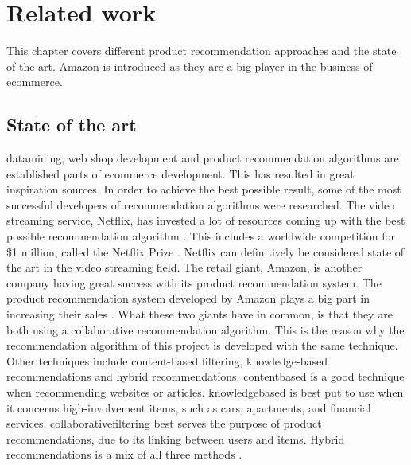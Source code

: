 
\chapter{Related work} %

\label{RelatedWork} %

This chapter covers different product recommendation approaches and the state of the art. \gls{Amazon} is introduced as they are a big player in the business of \gls{ecommerce}.

\section{State of the art}

\gls{datamining}, web shop development and product recommendation algorithms are established parts of \gls{ecommerce} development. This has resulted in great inspiration sources. In order to achieve the best possible result, some of the most successful developers of recommendation algorithms were researched. The video streaming service, Netflix, has invested a lot of resources coming up with the best possible recommendation algorithm \cite{Netflix}. This includes a worldwide competition for \$1 million, called the Netflix Prize \cite{NetflixPrize}. Netflix can definitively be considered state of the art in the video streaming field. The retail giant, \gls{Amazon}, is another company having great success with its product recommendation system. The product recommendation system developed by \gls{Amazon} plays a big part in increasing their sales \cite{AmazonSuccess}. What these two giants have in common, is that they are both using a collaborative recommendation algorithm. This is the reason why the recommendation algorithm of this project is developed with the same technique. Other techniques include content-based filtering, knowledge-based recommendations and hybrid recommendations. \gls{contentbased} is a good technique when recommending websites or articles. \gls{knowledgebased} is best put to use when it concerns high-involvement items, such as cars, apartments, and financial services. \gls{collaborativefiltering} best serves the purpose of product recommendations, due to its linking between users and items. Hybrid recommendations is a mix of all three methods \cite{recommendationtechniques}.


